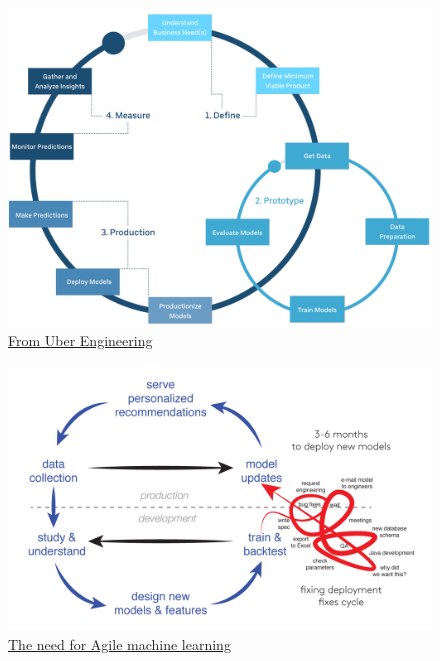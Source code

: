 \documentclass[aspectratio=169,10pt,xcolor=x11names,english,french]{beamer}
\begin{document}
	\begin{frame}
		\begin{figure}
			\centering
			\includegraphics[scale=0.19]{img/cycle.png}
			\caption{\href{https://eng.uber.com/scaling-michelangelo/}{From Uber Engineering}}
		\end{figure}
	\end{frame}
	
	\begin{frame}
		\begin{figure}
			\centering
			\includegraphics[scale=0.24]{img/cycle-white.png}
			\caption{\href{https://johann.schleier-smith.com/blog/2015/08/09/need-for-agile-machine-learning.html}{The need for Agile machine learning}}
		\end{figure}
	\end{frame}
	
\end{document}

